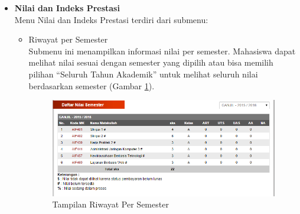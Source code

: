 \documentclass[a4paper,twoside]{article}
\begin{document}
\begin{enumerate}
\begin{enumerate}
\begin{enumerate}
\begin{itemize}
		\item \textbf{Nilai dan Indeks Prestasi}\\
		Menu Nilai dan Indeks Prestasi terdiri dari submenu: 
		\begin{itemize}
			\item Riwayat per Semester \\
			Submenu ini menampilkan informasi nilai per semester. Mahasiswa dapat melihat nilai sesuai dengan semester yang dipilih atau bisa memilih
pilihan ``Seluruh Tahun Akademik'' untuk melihat seluruh nilai berdasarkan semester (Gambar \ref{fig:3_pam_utama_nilai}).
			\begin{figure}[H]
				\centering
				\includegraphics[scale=0.5]{Gambar/pam-utama-nilai}
				\caption{Tampilan Riwayat Per Semester} 
				\label{fig:3_pam_utama_nilai}
			\end{figure}
			

\end{itemize}
\end{itemize}
\end{enumerate}
\end{enumerate}
\end{enumerate}
\end{document}
